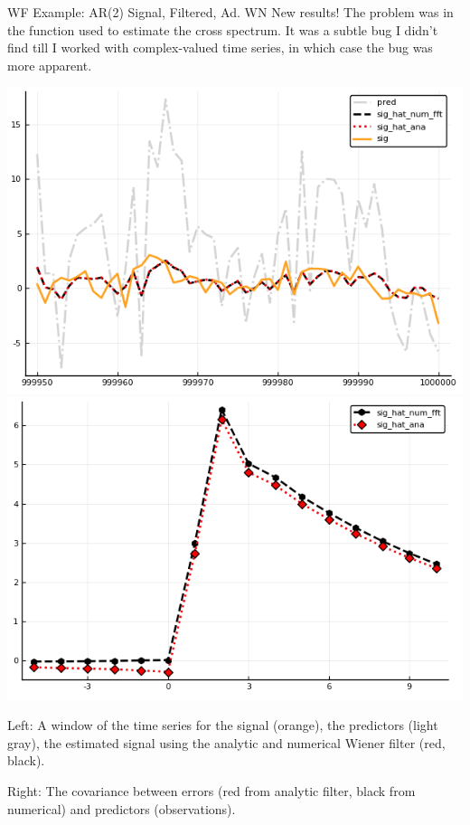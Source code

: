 \documentclass{beamer}  %
\begin{document}
\begin{frame}{WF Example: AR(2) Signal, Filtered, Ad. WN}
	New results! The problem was in the function used to estimate the cross spectrum. It was a subtle bug I didn't find till I worked with complex-valued time series, in which case the bug was more apparent.  
	
	\includegraphics[scale=.33]{fig/figAR2F_ts_new.png}
	\includegraphics[scale=.33]{fig/figAR2F_cov_new.png}
	
	Left: A window of the time series for the signal (orange), the predictors (light gray), the estimated signal using the analytic and numerical Wiener filter (red, black). 
	
	Right: The covariance between errors (red from analytic filter, black from numerical) and predictors (observations). \\
\end{frame}
\end{document}
